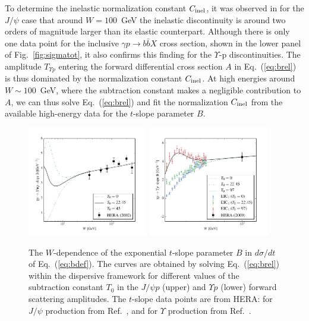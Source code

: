 \documentclass[prd,amsmath,%
twocolumn,floatfix,amssymb, preprintnumbers, nofootinbib, superscriptaddress]{revtex4}
\begin{document}
To determine the inelastic normalization constant $C_{\rm inel}$, it was observed in \cite{Gryniuk:2016mpk} for the $J/\psi$ case that around 
$W = 100$~GeV the inelastic discontinuity is around two orders of magnitude larger than its elastic counterpart. Although there is only one data point for the inclusive $\gamma p \to b \bar b X$ cross section, shown in the lower panel of  Fig.~\ref{fig:sigmatot}, it also confirms this finding for the $\Upsilon$-p discontinuities.   
The amplitude $T_{\Upsilon p}$ entering the forward differential cross section $A$ in Eq.~(\ref{eq:brel}) is thus dominated by the normalization constant $C_{\rm inel}$. At high energies around $W \sim 100$~GeV, where the subtraction constant makes a negligible contribution to $A$, we can thus solve Eq.~(\ref{eq:brel}) and fit the normalization $C_{\rm inel}$ from the available high-energy data for the $t$-slope parameter $B$. 

 

\begin{figure}[h]
\includegraphics[width=0.47\textwidth]{b_slope_jpsi.pdf}
\includegraphics[width=0.47\textwidth]{b_slope_eic1.pdf}
\caption{
The $W$-dependence of the exponential $t$-slope parameter $B$ in $d \sigma / dt$ of Eq.~(\ref{eq:bdef}). The curves are obtained by solving 
Eq.~(\ref{eq:brel}) within the dispersive framework  for different values of the subtraction constant $T_0$ in the $J/\psi p $ (upper)  and $\Upsilon p$ (lower) forward scattering amplitudes.
The $t$-slope data points are from HERA: for $J/\psi$ production from Ref.~\cite{Chekanov:2002xi}, and 
for $\Upsilon$ production from Ref.~\cite{Chekanov:2009zz}.
}
\label{fig:bslope}
\end{figure}
\end{document}
